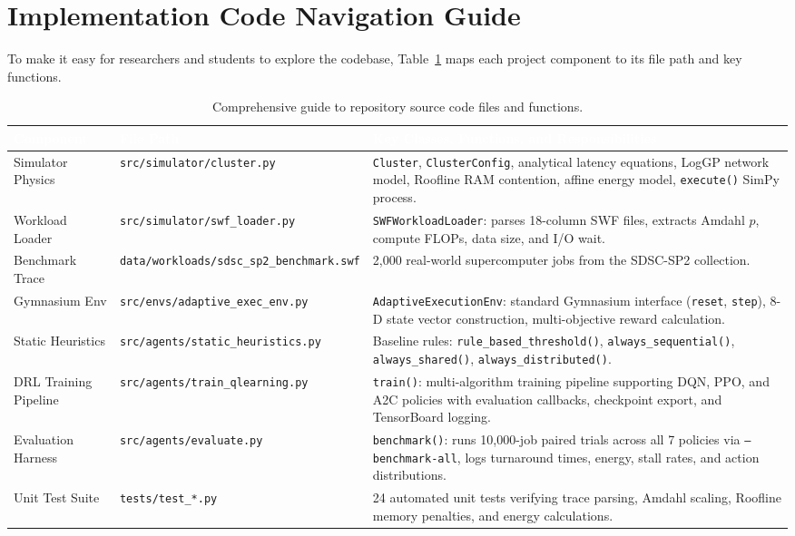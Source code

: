 \documentclass[11pt,a4paper]{article}
\begin{document}
\section{Implementation Code Navigation Guide}
To make it easy for researchers and students to explore the codebase, Table~\ref{tab:code_navigation} maps each project component to its file path and key functions.

\begin{table}[tbp]
\centering
\footnotesize
\renewcommand{\arraystretch}{1.25}
\begin{tabularx}{\textwidth}{l l X}
\toprule
\rowcolor{tableheader}
\textcolor{white}{\textbf{Component}} & \textcolor{white}{\textbf{File Path}} & \textcolor{white}{\textbf{Key Classes, Functions, and Responsibilities}} \\
\midrule
Simulator Physics & \texttt{src/simulator/cluster.py} & \texttt{Cluster}, \texttt{ClusterConfig}, analytical latency equations, LogGP network model, Roofline RAM contention, affine energy model, \texttt{execute()} SimPy process. \\
\rowcolor{altrow}
Workload Loader & \texttt{src/simulator/swf\_loader.py} & \texttt{SWFWorkloadLoader}: parses 18-column SWF files, extracts Amdahl $p$, compute FLOPs, data size, and I/O wait. \\
Benchmark Trace & \texttt{data/workloads/sdsc\_sp2\_benchmark.swf} & 2,000 real-world supercomputer jobs from the SDSC-SP2 collection. \\
\rowcolor{altrow}
Gymnasium Env & \texttt{src/envs/adaptive\_exec\_env.py} & \texttt{AdaptiveExecutionEnv}: standard Gymnasium interface (\texttt{reset}, \texttt{step}), 8-D state vector construction, multi-objective reward calculation. \\
Static Heuristics & \texttt{src/agents/static\_heuristics.py} & Baseline rules: \texttt{rule\_based\_threshold()}, \texttt{always\_sequential()}, \texttt{always\_shared()}, \texttt{always\_distributed()}. \\
\rowcolor{altrow}
DRL Training Pipeline & \texttt{src/agents/train\_qlearning.py} & \texttt{train()}: multi-algorithm training pipeline supporting DQN, PPO, and A2C policies with evaluation callbacks, checkpoint export, and TensorBoard logging. \\
Evaluation Harness & \texttt{src/agents/evaluate.py} & \texttt{benchmark()}: runs 10,000-job paired trials across all 7 policies via \texttt{--benchmark-all}, logs turnaround times, energy, stall rates, and action distributions. \\
\rowcolor{altrow}
Unit Test Suite & \texttt{tests/test\_*.py} & 24 automated unit tests verifying trace parsing, Amdahl scaling, Roofline memory penalties, and energy calculations. \\
\bottomrule
\end{tabularx}
\caption{Comprehensive guide to repository source code files and functions.}
\label{tab:code_navigation}
\end{table}
\end{document}

